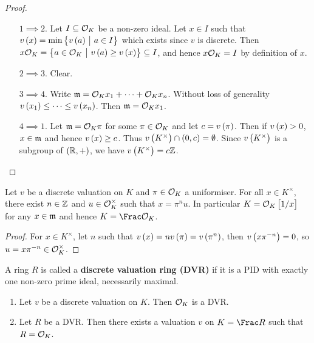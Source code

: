 \begin{proof}
\hfill
\begin{itemize}[leftmargin=0.5in]
\item[$ 1 \implies 2 $.] Let $ I \subseteq \mathcal{O}_K $ be a non-zero ideal. Let $ x \in I $ such that $ v\br{x} = \min \cbr{v\br{a} \st a \in I} $ which exists since $ v $ is discrete. Then $ x\OOO_K = \cbr{a \in \OOO_K \st v\br{a} \ge v\br{x}} \subseteq I $, and hence $ x\mathcal{O}_K = I $ by definition of $ x $.
\item[$ 2 \implies 3 $.] Clear.
\item[$ 3 \implies 4 $.] Write $ \mathfrak{m} = \mathcal{O}_Kx_1 + \dots + \mathcal{O}_Kx_n $. Without loss of generality $ v\br{x_1} \le \dots \le v\br{x_n} $. Then $ \mathfrak{m} = \mathcal{O}_Kx_1 $.
\item[$ 4 \implies 1 $.] Let $ \mathfrak{m} = \mathcal{O}_K\pi $ for some $ \pi \in \mathcal{O}_K $ and let $ c = v\br{\pi} $. Then if $ v\br{x} > 0 $, $ x \in \mathfrak{m} $ and hence $ v\br{x} \ge c $. Thus $ v\br{K^\times} \cap \br{0, c} = \emptyset $. Since $ v\br{K^\times} $ is a subgroup of $ \br{\RR, +} $, we have $ v\br{K^\times} = c\ZZ $.
\end{itemize}
\end{proof}

\begin{lemma}
Let $ v $ be a discrete valuation on $ K $ and $ \pi \in \mathcal{O}_K $ a uniformiser. For all $ x \in K^\times $, there exist $ n \in \mathbb{Z} $ and $ u \in \mathcal{O}_K^\times $ such that $ x = \pi^nu $. In particular $ K = \OOO_K\sbr{1 / x} $ for any $ x \in \mathfrak{m} $ and hence $ K = \Frac \OOO_K $.
\end{lemma}

\begin{proof}
For $ x \in K^\times $, let $ n $ such that $ v\br{x} = nv\br{\pi} = v\br{\pi^n} $, then $ v\br{x\pi^{-n}} = 0 $, so $ u = x\pi^{-n} \in \mathcal{O}_K^\times $.
\end{proof}

\begin{definition}
A ring $ R $ is called a \textbf{discrete valuation ring (DVR)} if it is a PID with exactly one non-zero prime ideal, necessarily maximal.
\end{definition}

\begin{lemma}
\hfill
\begin{enumerate}
\item Let $ v $ be a discrete valuation on $ K $. Then $ \mathcal{O}_K $ is a DVR.
\item Let $ R $ be a DVR. Then there exists a valuation $ v $ on $ K = \Frac R $ such that $ R = \mathcal{O}_K $.
\end{enumerate}
\end{lemma}

